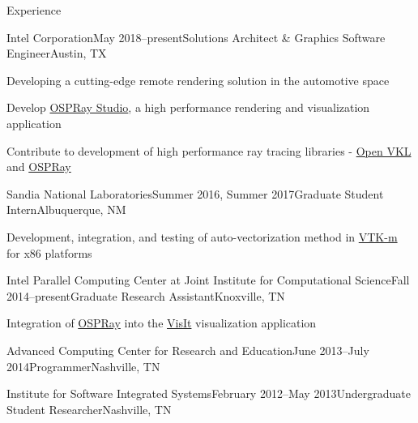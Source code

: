 \documentclass{resume} %
\begin{document}
\begin{rSection}{Experience}

\begin{rSubsection}{Intel Corporation}{May 2018--present}{Solutions Architect \& Graphics Software Engineer}{Austin, TX}
    \item Developing a cutting-edge remote rendering solution in the automotive space
    \item Develop \href{https://github.com/ospray/ospray\_studio}{OSPRay Studio}, a high performance rendering and visualization application
    \item Contribute to development of high performance ray tracing libraries - \href{https://www.openvkl.org/}{Open VKL} and \href{https://www.ospray.org/}{OSPRay}
\end{rSubsection}


\begin{rSubsection}{Sandia National Laboratories}{Summer 2016, Summer 2017}{Graduate Student Intern}{Albuquerque, NM}
    \item Development, integration, and testing of auto-vectorization method in \href{http://m.vtk.org}{VTK-m} for x86 platforms
\end{rSubsection}


\begin{rSubsection}{Intel Parallel Computing Center at Joint Institute for Computational Science}{Fall 2014--present}{Graduate Research Assistant}{Knoxville, TN}
    \item Integration of \href{http://www.ospray.org/}{OSPRay} into the \href{https://visit.llnl.gov/}{VisIt} visualization application
\end{rSubsection}


\begin{rSubsectionNoList}{Advanced Computing Center for Research and Education}{June 2013--July 2014}{Programmer}{Nashville, TN}
\end{rSubsectionNoList}


\begin{rSubsectionNoList}{Institute for Software Integrated Systems}{February 2012--May 2013}{Undergraduate Student Researcher}{Nashville, TN}
\end{rSubsectionNoList}


\end{rSection}
\end{document}
